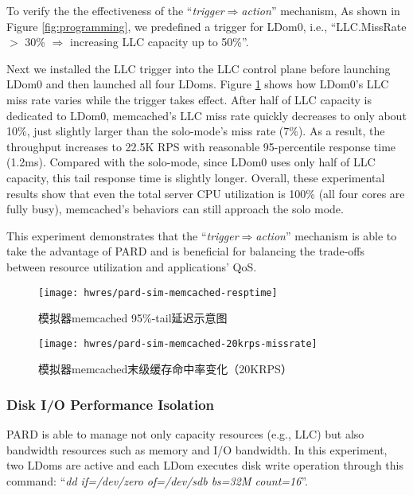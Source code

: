 To verify the the effectiveness of the ``\emph{trigger$\Rightarrow$action}'' mechanism,
As shown in Figure \ref{fig:programming}, we predefined a trigger for LDom0, i.e.,
``LLC.MissRate $>$ 30\% $\Rightarrow$ increasing LLC capacity up to 50\%''.

Next we installed the LLC trigger into the LLC control plane before launching
LDom0 and then launched all four LDoms. Figure \ref{fig:pardsim:memcached-20krps-missrate} shows how
LDom0's LLC miss rate varies while the trigger takes effect. After half of LLC capacity is
dedicated to LDom0, memcached's LLC miss rate quickly decreases to
only about 10\%, just slightly larger than the solo-mode's miss rate (7\%).
As a result, the throughput increases to 22.5K RPS with reasonable
95-percentile response time (1.2ms). Compared with the solo-mode, 
since LDom0 uses only half of LLC capacity, this tail response time is 
slightly longer. Overall, these experimental results show that even the total 
server CPU utilization is 100\% (all four cores are fully busy),
memcached's behaviors can still approach the solo mode.

This experiment demonstrates that the ``\emph{trigger$\Rightarrow$action}'' mechanism 
is able to take the advantage of PARD and is beneficial for balancing the trade-offs between
resource utilization and applications' QoS.

\begin{figure}[tb]
\begin{minipage}{0.48\textwidth}
  \centering
  \texttt{[image: hwres/pard-sim-memcached-resptime]}
  \caption{模拟器memcached 95\%-tail延迟示意图}
  \label{fig:pardsim:memcached-resptime}
\end{minipage}\hfill
\begin{minipage}{0.48\textwidth}
  \centering
  \texttt{[image: hwres/pard-sim-memcached-20krps-missrate]}
  \caption{模拟器memcached末级缓存命中率变化（20KRPS）}
  \label{fig:pardsim:memcached-20krps-missrate}
\end{minipage}
\end{figure}

\subsubsection{Disk I/O Performance Isolation}

PARD is able to manage not only capacity resources (e.g., LLC)
but also bandwidth resources such as memory and I/O bandwidth.
In this experiment, two LDoms are active and each LDom executes
disk write operation through
this command: ``\emph{dd if=/dev/zero of=/dev/sdb bs=32M count=16}''.

